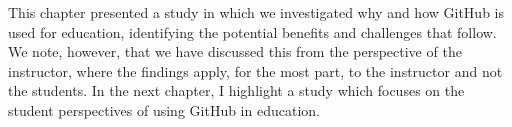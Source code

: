 This chapter presented a study in which we investigated why and how GitHub is used for education, identifying the potential benefits and challenges that follow. We note, however, that we have discussed this from the perspective of the instructor, where the findings apply, for the most part, to the instructor and not the students. In the next chapter, I highlight a study which focuses on the student perspectives of using GitHub in education.

